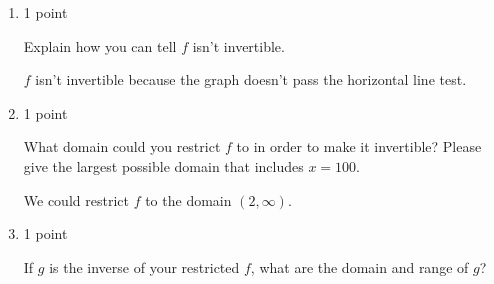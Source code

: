 \documentclass{article}
\begin{document}
\begin{enumerate}
\begin{enumerate}
\begin{solution}
      \begin{center}
      \end{center}
    \end{solution}

  \item

    \begin{grading}
      1 point
    \end{grading}

    \begin{problem}[\stretch{0.5}]
      Explain how you can tell $f$ isn't invertible.
    \end{problem}

    \begin{solution}
      $f$ isn't invertible because the graph doesn't pass the horizontal line test.
    \end{solution}

  \item

    \begin{grading}
      1 point
    \end{grading}

    \begin{problem}[\stretch{0.5}]
      What domain could you restrict $f$ to in order to make it invertible? Please give the largest possible domain that includes $x = 100$.
    \end{problem}

    \begin{solution}
      We could restrict $f$ to the domain $(2, \infty)$.
    \end{solution}

  \item

    \begin{grading}
      1 point
    \end{grading}

    \begin{problem}[\nstretch{0.5}]
      If $g$ is the inverse of your restricted $f$, what are the domain and range of $g$?
    \end{problem}


\end{enumerate}
\end{enumerate}
\end{document}

